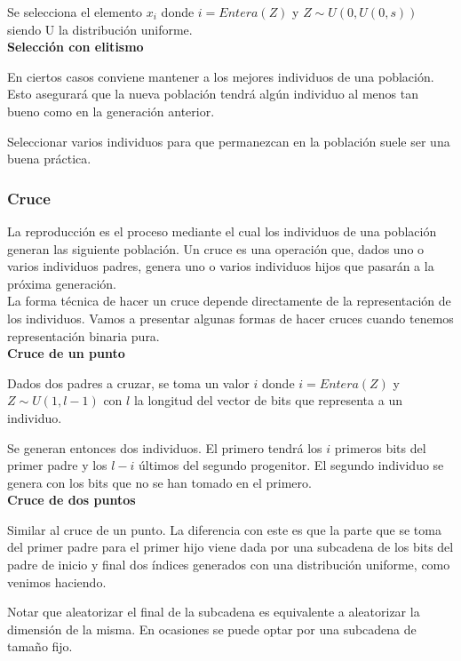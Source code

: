 \documentclass[12pt,a4paper]{article}
\begin{document}
			Se selecciona el elemento $x_i$ donde $i=Entera(Z)$ y $Z\sim U(0,U(0,s))$ siendo U la distribuci\'on uniforme.\\
			
			\textbf{Selecci\'on con elitismo}
			
			En ciertos casos conviene mantener a los mejores individuos de una poblaci\'on. Esto asegurar\'a que la nueva poblaci\'on tendr\'a alg\'un individuo al menos tan bueno como en la generaci\'on anterior.
			
			Seleccionar varios individuos para que permanezcan en la poblaci\'on suele ser una buena pr\'actica.
			
			\subsubsection{Cruce}
			
			La reproducci\'on es el proceso mediante el cual los individuos de una poblaci\'on generan las siguiente poblaci\'on. Un cruce es una operaci\'on que, dados uno o varios individuos padres, genera uno o varios individuos hijos que pasar\'an a la pr\'oxima generaci\'on.\\
			
			La forma t\'ecnica de hacer un cruce depende directamente de la representaci\'on de los individuos. Vamos a presentar algunas formas de hacer cruces cuando tenemos representaci\'on binaria pura.\\
			
			\textbf{Cruce de un punto}
			
			Dados dos padres a cruzar, se toma un valor $i$ donde $i=Entera(Z)$ y $Z\sim U(1,l-1)$ con $l$ la longitud del vector de bits que representa a un individuo. 
			
			Se generan entonces dos individuos. El primero tendr\'a los $i$ primeros bits del primer padre y los $l-i$ \'ultimos del segundo progenitor. El segundo individuo se genera con los bits que no se han tomado en el primero.\\
			
			\textbf{Cruce de dos puntos}

			Similar al cruce de un punto. La diferencia con este es que la parte que se toma del primer padre para el primer hijo viene dada por una subcadena de los bits del padre de inicio y final dos \'indices generados con una distribuci\'on uniforme, como venimos haciendo.
			
			Notar que aleatorizar el final de la subcadena es equivalente a aleatorizar la dimensi\'on de la misma. En ocasiones se puede optar por una subcadena de tama\~no fijo. \\
			
\end{document}
